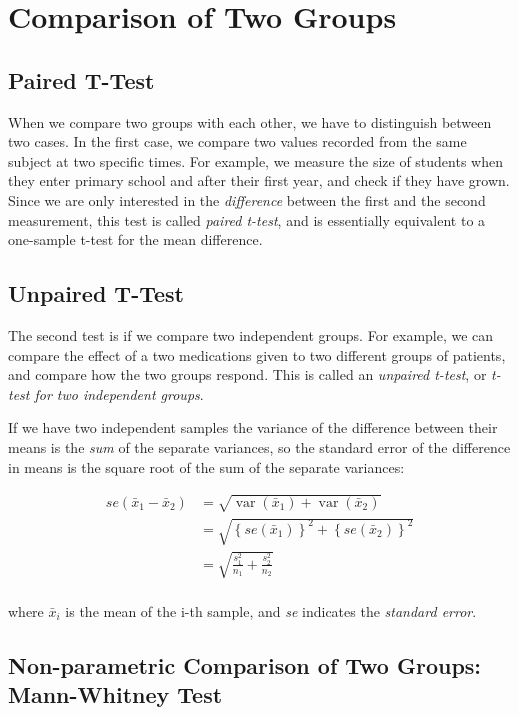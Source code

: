 \section{Comparison of Two Groups} 

\subsection{Paired T-Test}
When we compare two groups with each other, we have to distinguish between two cases. In the first case, we compare two values recorded from the same subject at two specific times. For example, we measure the size of students when they enter primary school and after their first year, and check if they have grown. Since we are only interested in the \emph{difference} between the first and the second measurement, this test is called \emph{paired t-test}, and is essentially equivalent to a one-sample t-test for the mean difference.

\subsection{Unpaired T-Test}
The second test is if we compare two independent groups. For example, we can compare the effect of a two medications given to two different groups of patients, and compare how the two groups respond. This is called an \emph{unpaired t-test}, or \emph{t-test for two independent groups}.

If we have two independent samples the variance of the difference between their means is the \emph{sum} of the separate variances, so the standard error of the difference in means is the square root of the sum of the separate variances:

\begin{align*}
   se({{\bar x}_1} - {{\bar x}_2}) &= \sqrt {\operatorname{var} ({{\bar x}_1}) + \operatorname{var} ({{\bar x}_2})}  \\
   &= \sqrt {{{\left\{ {se({{\bar x}_1})} \right\}}^2} + {{\left\{ {se({{\bar x}_2})} \right\}}^2}}  \\
   &= \sqrt {\frac{{s_1^2}}{{{n_1}}} + \frac{{s_2^2}}{{{n_2}}}}  \\
\end{align*}

where $\bar{x}_i$ is the mean of the i-th sample, and \emph{se} indicates the \emph{standard error}.

\subsection{Non-parametric Comparison of Two Groups: Mann-Whitney Test} \label{test:Mann-Whitney}


